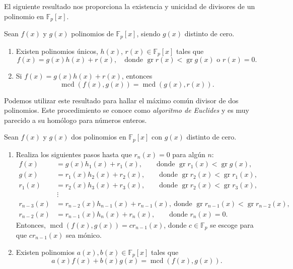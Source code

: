 El siguiente resultado nos proporciona la existencia y unicidad de divisores de un polinomio en \(\mathbb F_p[x]\).


\begin{theorem}
  \label{th:algoritmo-division}
  Sean \(f(x)\) y \(g(x)\) polinomios de \(\mathbb F_p[x]\), siendo \(g(x)\) distinto de cero.
  \begin{enumerate}
    \item \label{thi:algoritmo-division-division} Existen polinomios únicos, \(h(x)\), \(r(x) \in \mathbb F_p[x]\) tales que \[
      f(x) = g(x)h(x) + r(x), \quad \text{donde } \operatorname{gr} r(x) < \operatorname{gr} g(x) \text{ o } r(x) = 0. 
    \]
    \item \label{thi:algoritmo-division-mcd} Si \(f(x) = g(x)h(x) + r(x)\), entonces \[\operatorname{mcd}(f(x), g(x)) = \operatorname{mcd}(g(x), r(x)).\]
  \end{enumerate}
\end{theorem}

Podemos utilizar este resultado para hallar el máximo común divisor de dos polinomios.
Este procedimiento se conoce como \textit{algoritmo de Euclides} y es muy parecido a su homólogo para números enteros.

\begin{theorem}
  Sean \(f(x)\) y \(g(x)\) dos polinomios en \(\mathbb F_p[x]\) con \(g(x)\) distinto de cero.
  \begin{enumerate}
    \item Realiza los siguientes pasos hasta que \(r_n(x) = 0\) para algún \(n\):
    \begin{align*}
      f(x) &= g(x)h_1(x) + r_1(x), \qquad \text{donde } \operatorname{gr} r_1(x) < \operatorname{gr} g(x),\\
      g(x) &= r_1(x)h_2(x) + r_2(x), \qquad \text{donde } \operatorname{gr} r_2(x) < \operatorname{gr} r_1(x),\\
      r_1(x) &= r_2(x)h_3(x) + r_3(x), \qquad \text{donde } \operatorname{gr} r_2(x) < \operatorname{gr} r_3(x),\\
        &\,\vdots \\
      r_{n-3}(x) &= r_{n-2}(x)h_{n-1}(x) + r_{n-1}(x), \ \text{donde } \operatorname{gr} r_{n-1}(x) < \operatorname{gr} r_{n-2}(x),\\
      r_{n-2}(x) &= r_{n-1}(x)h_n(x) + r_n(x), \qquad \text{donde } r_n(x) = 0.
    \end{align*} 
    Entonces, \(\operatorname{mcd}(f(x), g(x)) = cr_{n-1}(x)\), donde \(c \in \mathbb F_p\) se escoge para que \(cr_{n-1}(x)\) sea mónico.
    \item Existen polinomios \(a(x), b(x) \in \mathbb F_p[x]\) tales que 
    \[
      a(x)f(x) + b(x)g(x) = \operatorname{mcd}(f(x), g(x)).
    \]
  \end{enumerate}
  \label{th:algoritmo-euclides}
\end{theorem}

